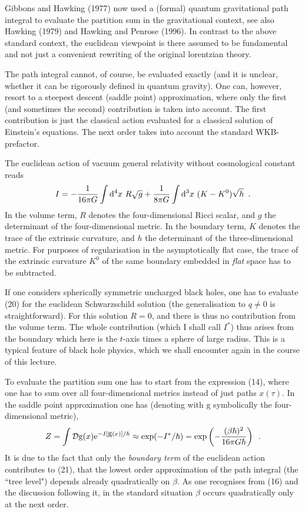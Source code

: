 \documentclass[12pt]{article}
\def\D{{\rm d}}
\def\E{{\rm e}}
\newcommand{\be}{\begin{equation}}
\newcommand{\ee}{\end{equation}}
\begin{document}
Gibbons and Hawking (1977) now used a (formal) quantum gravitational
path integral to evaluate the partition sum in the gravitational
context, see also Hawking (1979) and Hawking and Penrose (1996).
In contrast to the above standard context, the euclidean 
viewpoint is there assumed to be fundamental and not just a convenient
rewriting of the original lorentzian theory.      

The path integral cannot, of course, be evaluated exactly
(and it is unclear, whether it can be rigorously defined in
quantum gravity). One can, however, resort to a steepest descent
(saddle point) approximation, where only the first (and sometimes the second)
contribution is taken into account. The first contribution
is just the classical action evaluated for a classical
solution of Einstein's equations. The next order takes into
account the standard WKB-prefactor.

 The euclidean action of vacuum general relativity without
  cosmological constant reads
\be I=-\frac{1}{16\pi G}\int\D^4x\ R\sqrt{g}
    +\frac{1}{8\pi G}\int\D^3x\ (K-K^0)\sqrt{h} \enspace . \ee
In the volume term, $R$ denotes the four-dimensional Ricci scalar, and $g$
the determinant of the four-dimensional metric. In the boundary term,
$K$ denotes the trace of the extrinsic curvature, and $h$ the determinant
of the three-dimensional metric.
 For purposes of regularisation
in the asymptotically flat case,
the trace of the extrinsic curvature $K^0$ of the same boundary
embedded in {\em flat} space has to be subtracted. 

If one considers spherically symmetric uncharged black holes,
one has to evaluate (20) for the euclidean Schwarzschild solution
(the generalisation to $q\neq 0$ is straightforward).
For this solution $R=0$, and there is thus no contribution
from the volume term. The whole contribution
(which I shall call $I^*$) thus arises
from the boundary which here is the $t$-axis times a sphere of 
large radius. This is a typical feature of black hole physics,
which we shall encounter again in the course of this lecture. 

To evaluate the partition sum one has to start from the expression
(14), where one has to sum over all four-dimensional metrics
instead of just paths $x(\tau)$. In the saddle point approximation
one has (denoting with $\mbox{g}$ symbolically the four-dimensional
metric),
\be Z=\int{\cal D}\mbox{g}(x)\E^{-I[\mbox{g}(x)]/\hbar}
    \approx\exp(-I^*/\hbar)= \exp\left(-\frac{(\beta\hbar)^2}{16\pi G\hbar}
    \right) \enspace . \ee
It is due to the fact that only the {\em boundary term} of the euclidean
action contributes to (21), that the lowest order approximation
of the path integral (the ``tree level") depends already
quadratically on $\beta$. As one recognises from (16) and the
discussion following it,
in the standard situation $\beta$ occurs quadratically only at the
next order. 
\end{document}
